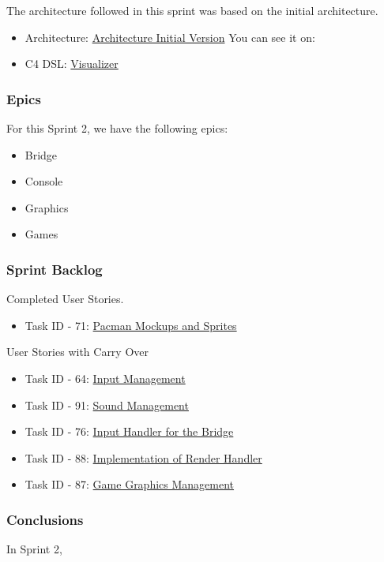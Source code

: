 The architecture followed in this sprint was based on the initial architecture.

\begin{itemize}
    \item Architecture: \href{https://github.com/Pending-Name-21/arquitecture/pull/1/files}{Architecture Initial Version}
    You can see it on: 
    \item C4 DSL: \href{https://structurizr.com/dsl}{Visualizer}
\end{itemize}

\newpage

\subsubsection{Epics}

For this Sprint 2, we have the following epics:

\begin{itemize}
    \item Bridge
    \item Console
    \item Graphics
    \item Games
\end{itemize}

\subsubsection{Sprint Backlog}

Completed User Stories.

\begin{itemize}
    \item Task ID - 71: \href{https://tree.taiga.io/project/joseluis-teran-coffeetime/us/71?milestone=393080}{Pacman Mockups and Sprites}    
\end{itemize}

User Stories with Carry Over

\begin{itemize}
    \item Task ID - 64: \href{https://tree.taiga.io/project/joseluis-teran-coffeetime/us/64?milestone=393697}{Input Management}
    \item Task ID - 91: \href{https://tree.taiga.io/project/joseluis-teran-coffeetime/us/91?milestone=393697}{Sound Management}
    \item Task ID - 76: \href{https://tree.taiga.io/project/joseluis-teran-coffeetime/us/76?milestone=393697}{Input Handler for the Bridge}
    \item Task ID - 88: \href{https://tree.taiga.io/project/joseluis-teran-coffeetime/us/88?milestone=394885}{Implementation of Render Handler}
    \item Task ID - 87: \href{https://tree.taiga.io/project/joseluis-teran-coffeetime/us/87?milestone=394885}{Game Graphics Management}
\end{itemize}

\subsubsection{Conclusions}

In Sprint 2, 
